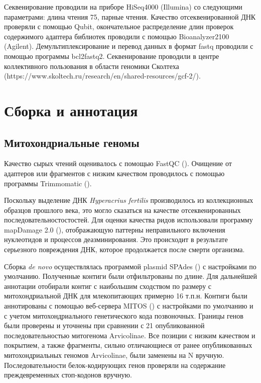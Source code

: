 Секвенирование проводили на приборе HiSeq4000 (Illumina) со следующими параметрами: длина чтения 75, парные чтения. Качество отсеквенированной ДНК проверяли с помощью Qubit, окончательное распределение длин проверок содержимого адаптера библиотек проводили с помощью Bioanalyzer2100 (Agilent). Демультиплексирование и перевод данных в формат fastq проводили с помощью программы bcl2fastq2. Секвенирование проводили в центре коллективного пользования в области геномики Сколтеха (https://www.skoltech.ru/research/en/shared-resources/gcf-2/).

\section{Сборка и аннотация}

\subsection{Митохондриальные геномы}

Качество сырых чтений оценивалось с помощью FastQC (\cite{Andrews2010}). Очищение от адаптеров или фрагментов с низким качеством проводилось с помощью программы Trimmomatic (\cite{Bolger2014}). 

Поскольку выделение ДНК \textit{Hyperacrius fertilis} производилось из коллекционных образцов прошлого века, это могло сказаться на качестве отсеквенированных последовательностостостей. Для оценки качества ридов использовали программу mapDamage 2.0 (\cite{Jonsson2013}), отображающую паттерны неправильного включения нуклеотидов и процессов деазминирования. Это происходит в результате серьезного повреждения ДНК, которое продолжается после смерти организма.

Сборка \textit{de novo} осуществлялась программой plasmid SPAdes (\cite{Bankevich2012}) с настройками по умолчанию. Полученные контиги были отфильтрованы по длине. Для дальнейшей аннотации отобирали контиг с наибольшим сходством по размеру с митохондриальной ДНК для млекопитающих примерно 16 т.п.н. Контиги были аннотированы с помощью веб-сервера MITOS (\cite{Bernt2013}) с настройками по умолчанию и с учетом митохондриального генетического кода позвоночных. Границы генов были проверены и уточнены при сравнении с 21 опубликованной последовательностью митогенома Arvicolinae. Все позиции с низким качеством и покрытием, а также фрагменты, сильно отличающиеся от ранее опубликованных митохондриальных геномов Arvicolinae, были заменены на N вручную. Последовательности белок-кодирующих генов проверяли на содержание преждевременных стоп-кодонов вручную.


